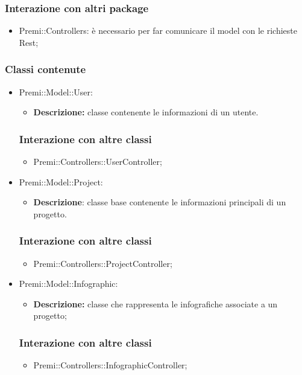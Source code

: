 		\subsubsection*{Interazione con altri package}
		\begin{itemize}
			\item Premi::Controllers: è necessario per far comunicare il model con le richieste Rest;
		\end{itemize}
	
	\subsubsection*{Classi contenute}
	\begin{itemize}
		\item Premi::Model::User:
		\begin{itemize}
			\item \textbf{Descrizione:} classe contenente le informazioni di un utente.
		\end{itemize}
		\subsubsection*{Interazione con altre classi}
		\begin{itemize}
			\item Premi::Controllers::UserController;
		\end{itemize}
		\item Premi::Model::Project:
		\begin{itemize}
			\item \textbf{Descrizione}: classe base contenente le informazioni principali di un progetto.
		\end{itemize}
		\subsubsection*{Interazione con altre classi}
		\begin{itemize}
			\item Premi::Controllers::ProjectController;
		\end{itemize}
			
		\item Premi::Model::Infographic:
		\begin{itemize}
			\item \textbf{Descrizione:} classe che rappresenta le infografiche associate a un progetto;
		\end{itemize}
		\subsubsection*{Interazione con altre classi}
		\begin{itemize}
			\item Premi::Controllers::InfographicController;
		\end{itemize}
		

\end{itemize}
